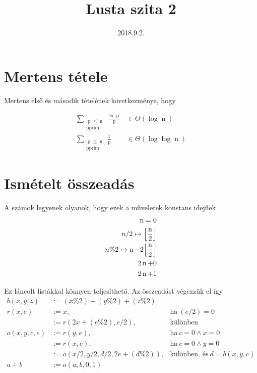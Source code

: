\documentclass[a4paper]{article}
\title{Lusta szita 2}
\author{}
\date{2018.9.2.}
\newcommand*{\vN}{\ensuremath{\operatorname{n}}}
\newcommand*{\vP}{\ensuremath{\operatorname{p}}}
\begin{document}
\maketitle

\tableofcontents

\section{Mertens tétele}

Mertens első és második tételének következménye, hogy

\begin{align*}
\sum_{\substack{\vP \leq \vN \\ \vP \text{prím}}} \frac{\ln{\vP}}{\vP} &\in \Theta(\log{\vN})
\\
\sum_{\substack{\vP \leq \vN \\ \vP \text{prím}}} \frac{1}{\vP} &\in \Theta(\log{\log{\vN}})
\end{align*}

\section{Ismételt összeadás}

A számok legyenek olyanok, hogy ezek a műveletek konstans idejűek
\begin{align*}
\vN = 0 \\
n / 2 \mapsto \Bigl\lfloor \frac{\vN}{2} \Bigr\rfloor \\
n \% 2 \mapsto \vN - 2 \Bigl\lfloor \frac{\vN}{2} \Bigr\rfloor \\
2 \vN + 0 \\
2 \vN + 1
\end{align*}

Ez láncolt listákkal könnyen teljesíthető. Az összeadást végezzük el így
\begin{align*}
b(x, y, z) &:= (x\%2)+(y\%2)+(z\%2) \\
r(x, e)
	&:= x, &\text{ha}\ (e/2)=0 \\
	&:= r(2x+(e \% 2), e/2), &\text{különben} \\
o(x, y, c, e)
	&:= r(y, e), &\text{ha}\ c=0 \land x=0 \\
	&:= r(x, e), &\text{ha}\ c=0 \land y=0 \\
	&:= o(x/2, y/2, d/2, 2e+(d \% 2)),
		&\text{különben, és}\ d=b(x, y, c)\\
a+b &:= o(a, b, 0, 1)
\end{align*}
\end{document}
